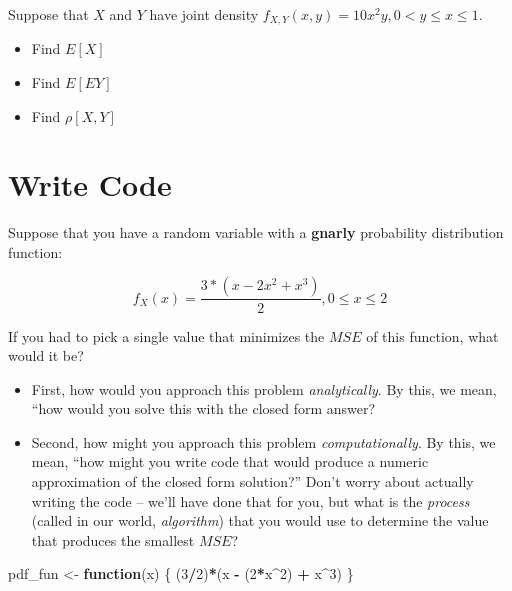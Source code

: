 \documentclass[
]{book}
\newenvironment{Shaded}{\begin{snugshade}}{\end{snugshade}}
\newcommand{\ControlFlowTok}[1]{\textcolor[rgb]{0.13,0.29,0.53}{\textbf{#1}}}
\newcommand{\DecValTok}[1]{\textcolor[rgb]{0.00,0.00,0.81}{#1}}
\newcommand{\NormalTok}[1]{#1}
\newcommand{\OtherTok}[1]{\textcolor[rgb]{0.56,0.35,0.01}{#1}}
\newcommand{\SpecialCharTok}[1]{\textcolor[rgb]{0.81,0.36,0.00}{\textbf{#1}}}
\providecommand{\tightlist}{%
  \setlength{\itemsep}{0pt}\setlength{\parskip}{0pt}}
\theoremstyle{definition}
\theoremstyle{definition}
\theoremstyle{definition}
\theoremstyle{definition}
\theoremstyle{remark}
\begin{document}
\hypertarget{section}{%
\subsubsection{}\label{section}}

Suppose that \(X\) and \(Y\) have joint density \(f_{X,Y}(x,y) = 10 x^2y, 0 < y \leq x \leq 1.\)

\begin{itemize}
\tightlist
\item
  Find \(E[X]\)
\item
  Find \(E[EY]\)
\item
  Find \(\rho[X,Y]\)
\end{itemize}

\hypertarget{write-code}{%
\section{Write Code}\label{write-code}}

Suppose that you have a random variable with a \textbf{gnarly} probability distribution function:

\[ 
  f_{X}(x) = \frac{3*\left(x - 2x^2 + x^3\right)}{2}, 0\leq x\leq 2
\]

If you had to pick a single value that minimizes the \(MSE\) of this function, what would it be?

\begin{itemize}
\tightlist
\item
  First, how would you approach this problem \emph{analytically}. By this, we mean, ``how would you solve this with the closed form answer?
\item
  Second, how might you approach this problem \emph{computationally}. By this, we mean, ``how might you write code that would produce a numeric approximation of the closed form solution?'' Don't worry about actually writing the code -- we'll have done that for you, but what is the \emph{process} (called in our world, \emph{algorithm}) that you would use to determine the value that produces the smallest \(MSE\)?
\end{itemize}

\begin{Shaded}
\begin{Highlighting}[]
\NormalTok{pdf\_fun }\OtherTok{\textless{}{-}} \ControlFlowTok{function}\NormalTok{(x) \{ }
\NormalTok{  (}\DecValTok{3}\SpecialCharTok{/}\DecValTok{2}\NormalTok{)}\SpecialCharTok{*}\NormalTok{(x }\SpecialCharTok{{-}}\NormalTok{ (}\DecValTok{2}\SpecialCharTok{*}\NormalTok{x}\SpecialCharTok{\^{}}\DecValTok{2}\NormalTok{) }\SpecialCharTok{+}\NormalTok{ x}\SpecialCharTok{\^{}}\DecValTok{3}\NormalTok{)}
\NormalTok{\}}
\end{Highlighting}
\end{Shaded}
\end{document}
